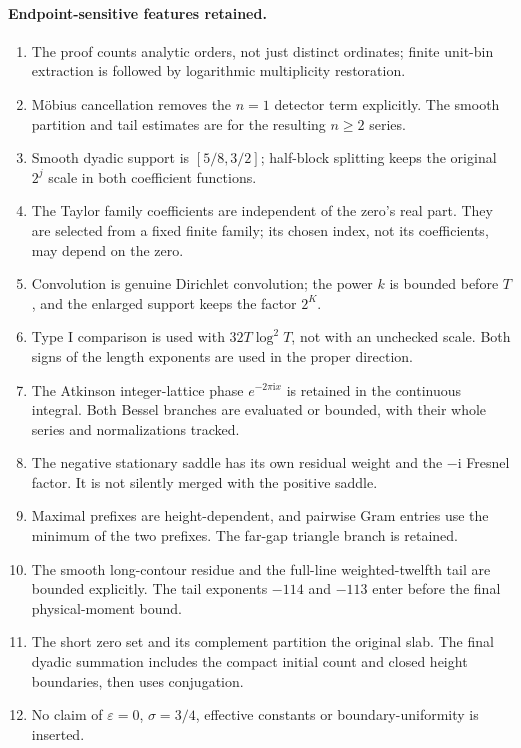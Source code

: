 \documentclass[11pt,a4paper]{article}
\numberwithin{equation}{section}
\theoremstyle{definition}
\newcommand{\ii}{\mathrm i}
\begin{document}
\paragraph{Endpoint-sensitive features retained.}
\begin{enumerate}
\item The proof counts analytic orders, not just distinct ordinates; finite
unit-bin extraction is followed by logarithmic multiplicity restoration.
\item M\"obius cancellation removes the $n=1$ detector term explicitly.
The smooth partition and tail estimates are for the resulting $n\ge2$ series.
\item Smooth dyadic support is $[5/8,3/2]$; half-block splitting keeps the
original $2^j$ scale in both coefficient functions.
\item The Taylor family coefficients are independent of the zero's real part.
They are selected from a fixed finite family; its chosen index, not its
coefficients, may depend on the zero.
\item Convolution is genuine Dirichlet convolution; the power $k$ is bounded
before $T$, and the enlarged support keeps the factor $2^K$.
\item Type I comparison is used with $32T\log^2T$, not with an unchecked
scale. Both signs of the length exponents are used in the proper direction.
\item The Atkinson integer-lattice phase $e^{-2\pi\ii x}$ is retained in the
continuous integral. Both Bessel branches are evaluated or bounded, with their
whole series and normalizations tracked.
\item The negative stationary saddle has its own residual weight and the
$-\ii$ Fresnel factor. It is not silently merged with the positive saddle.
\item Maximal prefixes are height-dependent, and pairwise Gram entries use
the minimum of the two prefixes. The far-gap triangle branch is retained.
\item The smooth long-contour residue and the full-line weighted-twelfth tail
are bounded explicitly. The tail exponents $-114$ and $-113$ enter before
the final physical-moment bound.
\item The short zero set and its complement partition the original slab.
The final dyadic summation includes the compact initial count and closed
height boundaries, then uses conjugation.
\item No claim of $\varepsilon=0$, $\sigma=3/4$, effective constants or
boundary-uniformity is inserted.
\end{enumerate}
\end{document}
